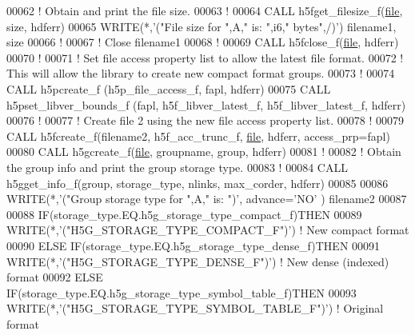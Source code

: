 \begin{DoxyCode}
00062   \textcolor{comment}{! Obtain and print the file size.}
00063   \textcolor{comment}{!}
00064   \textcolor{keyword}{CALL }h5fget\_filesize\_f(\hyperlink{structfile}{file}, \textcolor{keyword}{size}, hdferr)
00065   \textcolor{keyword}{WRITE}(*,\textcolor{stringliteral}{'("File size for ",A," is: ",i6," bytes",/)'}) filename1, \textcolor{keyword}{size}
00066   \textcolor{comment}{!}
00067   \textcolor{comment}{! Close filename1}
00068   \textcolor{comment}{!}
00069   \textcolor{keyword}{CALL }h5fclose\_f(\hyperlink{structfile}{file}, hdferr)
00070   \textcolor{comment}{!}
00071   \textcolor{comment}{! Set file access property list to allow the latest file format.}
00072   \textcolor{comment}{! This will allow the library to create new compact format groups.}
00073   \textcolor{comment}{!}
00074   \textcolor{keyword}{CALL }h5pcreate\_f (h5p\_file\_access\_f, fapl, hdferr)
00075   \textcolor{keyword}{CALL }h5pset\_libver\_bounds\_f (fapl, h5f\_libver\_latest\_f, h5f\_libver\_latest\_f, hdferr)
00076   \textcolor{comment}{!}
00077   \textcolor{comment}{! Create file 2 using the new file access property list.}
00078   \textcolor{comment}{!}
00079   \textcolor{keyword}{CALL }h5fcreate\_f(filename2, h5f\_acc\_trunc\_f, \hyperlink{structfile}{file}, hdferr, access\_prp=fapl)
00080   \textcolor{keyword}{CALL }h5gcreate\_f(\hyperlink{structfile}{file}, groupname, group, hdferr)
00081   \textcolor{comment}{!}
00082   \textcolor{comment}{! Obtain the group info and print the group storage type.}
00083   \textcolor{comment}{!}
00084   \textcolor{keyword}{CALL }h5gget\_info\_f(group, storage\_type, nlinks, max\_corder, hdferr)
00085 
00086   \textcolor{keyword}{WRITE}(*,\textcolor{stringliteral}{'("Group storage type for ",A," is: ")'}, advance=\textcolor{stringliteral}{'NO'} ) filename2
00087 
00088   \textcolor{keywordflow}{IF}(storage\_type.EQ.h5g\_storage\_type\_compact\_f)\textcolor{keywordflow}{THEN}
00089      \textcolor{keyword}{WRITE}(*,\textcolor{stringliteral}{'("H5G\_STORAGE\_TYPE\_COMPACT\_F")'}) \textcolor{comment}{! New compact format}
00090   \textcolor{keywordflow}{ELSE} \textcolor{keywordflow}{IF}(storage\_type.EQ.h5g\_storage\_type\_dense\_f)\textcolor{keywordflow}{THEN}
00091      \textcolor{keyword}{WRITE}(*,\textcolor{stringliteral}{'("H5G\_STORAGE\_TYPE\_DENSE\_F")'}) \textcolor{comment}{! New dense (indexed) format}
00092   \textcolor{keywordflow}{ELSE} \textcolor{keywordflow}{IF}(storage\_type.EQ.h5g\_storage\_type\_symbol\_table\_f)\textcolor{keywordflow}{THEN}
00093      \textcolor{keyword}{WRITE}(*,\textcolor{stringliteral}{'("H5G\_STORAGE\_TYPE\_SYMBOL\_TABLE\_F")'}) \textcolor{comment}{! Original format}

\end{DoxyCode}
